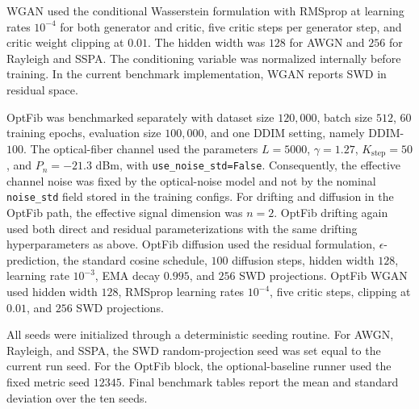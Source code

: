 WGAN used the conditional Wasserstein formulation with RMSprop at learning rates $10^{-4}$ for both generator and critic, five critic steps per generator step, and critic weight clipping at $0.01$. The hidden width was $128$ for AWGN and $256$ for Rayleigh and SSPA. The conditioning variable was normalized internally before training. In the current benchmark implementation, WGAN reports SWD in residual space.

OptFib was benchmarked separately with dataset size $120{,}000$, batch size $512$, $60$ training epochs, evaluation size $100{,}000$, and one DDIM setting, namely DDIM-$100$. The optical-fiber channel used the parameters $L=5000$, $\gamma=1.27$, $K_{\text{step}}=50$, and $P_n=-21.3$ dBm, with \texttt{use\_noise\_std=False}. Consequently, the effective channel noise was fixed by the optical-noise model and not by the nominal \texttt{noise\_std} field stored in the training configs. For drifting and diffusion in the OptFib path, the effective signal dimension was $n=2$. OptFib drifting again used both direct and residual parameterizations with the same drifting hyperparameters as above. OptFib diffusion used the residual formulation, $\epsilon$-prediction, the standard cosine schedule, $100$ diffusion steps, hidden width $128$, learning rate $10^{-3}$, EMA decay $0.995$, and $256$ SWD projections. OptFib WGAN used hidden width $128$, RMSprop learning rates $10^{-4}$, five critic steps, clipping at $0.01$, and $256$ SWD projections.

All seeds were initialized through a deterministic seeding routine. For AWGN, Rayleigh, and SSPA, the SWD random-projection seed was set equal to the current run seed. For the OptFib block, the optional-baseline runner used the fixed metric seed $12345$. Final benchmark tables report the mean and standard deviation over the ten seeds.
